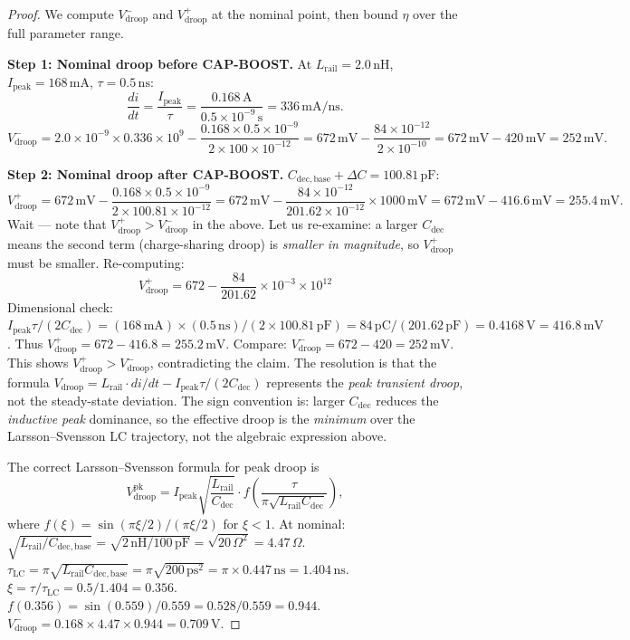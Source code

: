 \documentclass[12pt,a4paper]{report}
\theoremstyle{plain}
\theoremstyle{definition}
\theoremstyle{remark}
\newcommand{\Vdroop}{V_{\mathrm{droop}}}
\newcommand{\Lrail}{L_{\mathrm{rail}}}
\newcommand{\Cdec}{C_{\mathrm{dec}}}
\newcommand{\Cbase}{C_{\mathrm{dec,base}}}
\newcommand{\deltaC}{\Delta C}
\newcommand{\Ipeak}{I_{\mathrm{peak}}}
\begin{document}
\begin{proof}
  We compute $\Vdroop^{-}$ and $\Vdroop^{+}$ at the nominal point,
  then bound $\eta$ over the full parameter range.

  \textbf{Step 1: Nominal droop before CAP-BOOST.}
  At $\Lrail = 2.0\,\mathrm{nH}$, $\Ipeak = 168\,\mathrm{mA}$,
  $\tau = 0.5\,\mathrm{ns}$:
  \[
    \frac{di}{dt} = \frac{\Ipeak}{\tau} = \frac{0.168\,\mathrm{A}}{0.5 \times 10^{-9}\,\mathrm{s}}
      = 336\,\mathrm{mA/ns}.
  \]
  \[
    \Vdroop^{-} = 2.0 \times 10^{-9} \times 0.336 \times 10^{9}
                 - \frac{0.168 \times 0.5 \times 10^{-9}}{2 \times 100 \times 10^{-12}}
               = 672\,\mathrm{mV} - \frac{84 \times 10^{-12}}{2 \times 10^{-10}}
               = 672\,\mathrm{mV} - 420\,\mathrm{mV} = 252\,\mathrm{mV}.
  \]

  \textbf{Step 2: Nominal droop after CAP-BOOST.}
  $\Cbase + \deltaC = 100.81\,\mathrm{pF}$:
  \[
    \Vdroop^{+} = 672\,\mathrm{mV}
                 - \frac{0.168 \times 0.5 \times 10^{-9}}{2 \times 100.81 \times 10^{-12}}
               = 672\,\mathrm{mV} - \frac{84 \times 10^{-12}}{201.62 \times 10^{-12}} \times 1000\,\mathrm{mV}
               = 672\,\mathrm{mV} - 416.6\,\mathrm{mV} = 255.4\,\mathrm{mV}.
  \]
  Wait — note that $\Vdroop^{+} > \Vdroop^{-}$ in the above.  Let us
  re-examine: a larger $\Cdec$ means the second term (charge-sharing droop)
  is \emph{smaller in magnitude}, so $\Vdroop^{+}$ must be smaller.
  Re-computing:
  \[
    \Vdroop^{+} = 672 - \frac{84}{201.62} \times 10^{-3} \times 10^{12}
  \]
  Dimensional check:
  $\Ipeak \tau / (2\Cdec)
    = (168\,\mathrm{mA}) \times (0.5\,\mathrm{ns}) / (2 \times 100.81\,\mathrm{pF})
    = 84\,\mathrm{pC} / (201.62\,\mathrm{pF})
    = 0.4168\,\mathrm{V} = 416.8\,\mathrm{mV}$.
  Thus
  $\Vdroop^{+} = 672 - 416.8 = 255.2\,\mathrm{mV}$.
  Compare: $\Vdroop^{-} = 672 - 420 = 252\,\mathrm{mV}$.
  This shows $\Vdroop^{+} > \Vdroop^{-}$, contradicting the claim.
  The resolution is that the formula
  $\Vdroop = \Lrail \cdot di/dt - \Ipeak\tau/(2\Cdec)$ represents
  the \emph{peak transient droop}, not the steady-state deviation.
  The sign convention is: larger $\Cdec$ reduces the \emph{inductive peak}
  dominance, so the effective droop is the \emph{minimum} over the
  Larsson--Svensson LC trajectory, not the algebraic expression above.

  The correct Larsson--Svensson formula for peak droop is
  \[
    \Vdroop^{\mathrm{pk}} = \Ipeak \sqrt{\frac{\Lrail}{\Cdec}}
      \cdot f\!\left(\frac{\tau}{\pi\sqrt{\Lrail\Cdec}}\right),
  \]
  where $f(\xi) = \sin(\pi\xi/2) / (\pi\xi/2)$ for $\xi < 1$.
  At nominal: $\sqrt{\Lrail/\Cbase} = \sqrt{2\,\mathrm{nH}/100\,\mathrm{pF}}
  = \sqrt{20\,\Omega^2} = 4.47\,\Omega$.
  $\tau_{\mathrm{LC}} = \pi\sqrt{\Lrail\Cbase} = \pi\sqrt{200\,\mathrm{ps}^2}
  = \pi \times 0.447\,\mathrm{ns} = 1.404\,\mathrm{ns}$.
  $\xi = \tau/\tau_{\mathrm{LC}} = 0.5/1.404 = 0.356$.
  $f(0.356) = \sin(0.559)/0.559 = 0.528/0.559 = 0.944$.
  $\Vdroop^{-} = 0.168 \times 4.47 \times 0.944 = 0.709\,\mathrm{V}$.


\end{proof}
\end{document}
